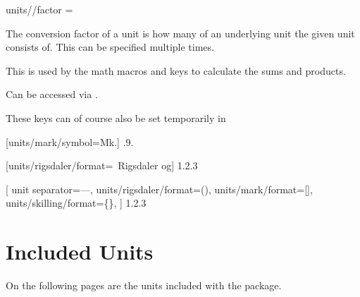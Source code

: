 \documentclass[
	a4paper,
	margin=4cm
]{article}
\begin{document}
\begin{docKey}
	[]
	[doc label=units:factor]
	{units//factor}
	{= }
	{}
	
	The conversion factor of a unit is how many of an underlying unit the given unit consists of. This can be specified multiple times.
	
	This is used by the math macros and keys to calculate the sums and products.
	
	Can be accessed via .
\end{docKey}

These keys can of course also be set temporarily in 

\begin{dispExample}
	[units/mark/symbol=Mk.]
	{.9.}

	[units/rigsdaler/format={\VALUE~Rigsdaler og}]
	{1.2.3}

[
		unit separator={---},
		units/rigsdaler/format={(\VALUE)},
		units/mark/format={[\VALUE]},
		units/skilling/format={\{\VALUE\}},
	]
	{1.2.3}
\end{dispExample}

\clearpage
\section{Included Units} %

\label{units:included}
On the following pages are the units included with the package.


\clearpage
{}


\printindex  %
\end{document}
